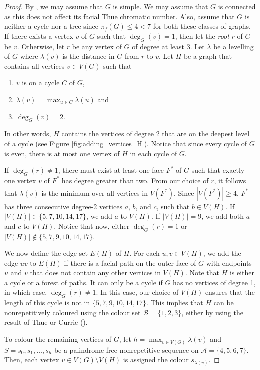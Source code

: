 \documentclass{patmorin}
\begin{document}
\begin{proof}
By , we may assume that $G$ is simple.
 We may assume that $G$ is connected as this does not affect its facial Thue chromatic number. Also, assume that $G$ is neither a cycle nor a tree since $\pi_f(G) \leq 4 < 7$ for both these classes of graphs.  
 If there exists a vertex $v$ of $G$ such that $\deg_G(v)=1$, then let
 the \emph{root} $r$ of $G$ be $v$. Otherwise, let $r$ be any vertex
 of $G$ of degree at least $3$. Let $\lambda$ be a levelling of $G$ where
 $\lambda(v)$ is the distance in $G$ from $r$ to $v$. Let $H$ be a graph that contains all vertices $v\in V(G)$ such that
 \begin{enumerate}
  \item $v$ is on a cycle $C$ of $G$,
  \item $\lambda(v)=\max_{u \in C} \lambda(u)$ and
  \item $\deg_G(v)=2$.
 \end{enumerate} 
 In other words, $H$ contains the vertices of degree 2 that are on the
 deepest level of a cycle (see Figure
 \ref{fig:adding_vertices_H}). Notice that since every cycle of $G$ is
 even, there is at most one vertex of $H$ in each cycle of $G$.

If $\deg_G(r)\not=1$, there must exist at least one face $F^*$ of $G$ such
that exactly one vertex $v$ of $F^*$ has degree greater than two. From
our choice of $r$, it follows that $\lambda(v)$ is the minimum over all
vertices in $V(F^*)$.  Since $|V(F^*)|\ge 4$, $F^*$ has three consecutive
degree-2 vertices $a$, $b$, and $c$, such that $b\in V(H)$. If $|V(H)|\in
\{5,7,10,14,17\}$, we add $a$ to $V(H)$. If $|V(H)|=9$, we add both $a$
and $c$ to $V(H)$. Notice that now, either $\deg_G(r)=1$ or $|V(H)|\notin
\{5,7,9,10,14,17\}$.

We now define the edge set $E(H)$ of $H$.  For each $u,v\in V(H)$,
we add the edge $uv$ to $E(H)$ if there is a facial path on the outer
face of $G$ with endpoints $u$ and $v$ that does not contain any other
vertices in $V(H)$.  Note that $H$ is either a cycle or a forest of
paths. It can only be a cycle if $G$ has no vertices of degree 1,
in which case, $\deg_G(r)\neq 1$.  In this case, our choice of $V(H)$
ensures that the length of this cycle is not in  $\{5,7,9,10,14,17\}$.
This implies that $H$ can be nonrepetitively coloured using the colour set
$\mathcal{B}=\{1,2,3\}$, either by using the result of Thue \cite{thue}
or Currie ().

To colour the remaining vertices of $G$, let $h=\max_{v \in V(G)}
\lambda(v)$ and $S=s_0,s_1,\ldots,s_h$ be a palindrome-free nonrepetitive
sequence on $\mathcal{A}=\{4,5,6,7\}$.  Then, each vertex $v\in
V(G)\setminus V(H)$ is assigned the colour $s_{\lambda(v)}$.


\end{proof}
\end{document}
